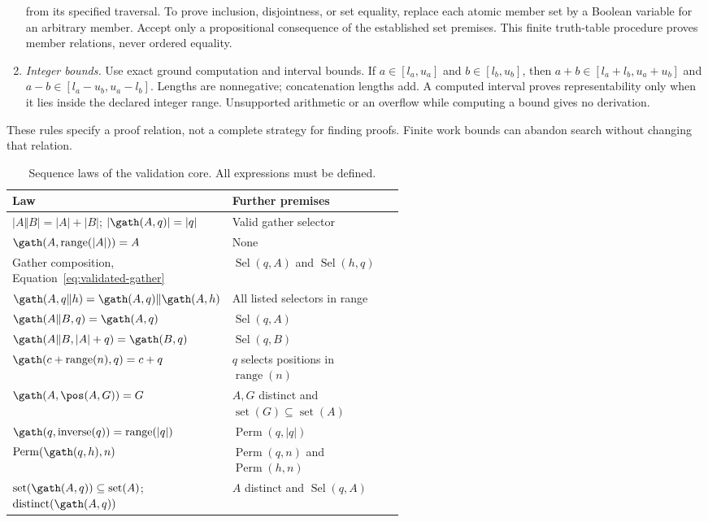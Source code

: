 \begin{enumerate}
from its specified traversal. To prove inclusion, disjointness, or set
equality, replace each atomic member set by a Boolean variable for an
arbitrary member. Accept only a propositional consequence of the
established set premises. This finite truth-table procedure proves member
relations, never ordered equality.
\item \emph{Integer bounds.} Use exact ground computation and interval
bounds. If $a\in[l_a,u_a]$ and $b\in[l_b,u_b]$, then
$a+b\in[l_a+l_b,u_a+u_b]$ and
$a-b\in[l_a-u_b,u_a-l_b]$. Lengths are nonnegative;
concatenation lengths add. A computed interval proves representability
only when it lies inside the declared integer range. Unsupported arithmetic
or an overflow while computing a bound gives no derivation.
\end{enumerate}
These rules specify a proof relation, not a complete strategy for finding
proofs. Finite work bounds can abandon search without changing that relation.

\begin{table}[!htbp]
\caption{Sequence laws of the validation core. All expressions must be defined.}
\label{tab:core-sequence-laws}
\small
\begin{tabularx}{\linewidth}{@{}p{0.56\linewidth}Y@{}}\toprule
Law & Further premises\\\midrule
$|A\Vert B|=|A|+|B|$; $|\gath(A,q)|=|q|$
& Valid gather selector\\
$\gath(A,\operatorname{range}(|A|))=A$
& None\\
Gather composition, Equation~\eqref{eq:validated-gather}
& $\operatorname{Sel}(q,A)$ and $\operatorname{Sel}(h,q)$\\
$\gath(A,q\Vert h)=\gath(A,q)\Vert\gath(A,h)$
& All listed selectors in range\\
$\gath(A\Vert B,q)=\gath(A,q)$
& $\operatorname{Sel}(q,A)$\\
$\gath(A\Vert B,|A|+q)=\gath(B,q)$
& $\operatorname{Sel}(q,B)$\\
$\gath(c+\operatorname{range}(n),q)=c+q$
& $q$ selects positions in $\operatorname{range}(n)$\\
$\gath(A,\pos(A,G))=G$
& $A,G$ distinct and $\operatorname{set}(G)\subseteq\operatorname{set}(A)$\\
$\gath(q,\operatorname{inverse}(q))=\operatorname{range}(|q|)$
& $\operatorname{Perm}(q,|q|)$\\
$\operatorname{Perm}(\gath(q,h),n)$
& $\operatorname{Perm}(q,n)$ and $\operatorname{Perm}(h,n)$\\
$\operatorname{set}(\gath(A,q))\subseteq\operatorname{set}(A)$;
$\operatorname{distinct}(\gath(A,q))$
& $A$ distinct and $\operatorname{Sel}(q,A)$\\\bottomrule
\end{tabularx}
\end{table}

